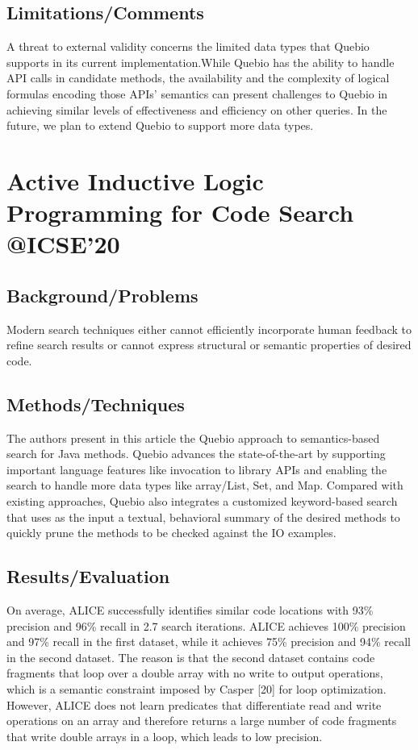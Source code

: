 \subsection{Limitations/Comments}
A threat to external validity concerns the limited data types that Quebio supports in its current implementation.While Quebio has the ability to handle API calls in candidate methods, the availability and the complexity of logical formulas encoding those APIs’ semantics can present challenges to Quebio in achieving similar levels of effectiveness and efficiency on other queries. In the future, we plan to extend Quebio to support more data types.
\newpage

\section{Active Inductive Logic Programming for Code Search \\@ICSE'20}
\subsection{Background/Problems}
Modern search techniques either cannot efficiently incorporate human feedback to refine search results or cannot express structural or semantic properties of desired code.
\subsection{Methods/Techniques}
The authors present in this article the Quebio approach to semantics-based search for Java methods. Quebio advances the state-of-the-art by supporting important language features like invocation to library APIs and enabling the search to handle more data types like array/List, Set, and Map. Compared with existing approaches, Quebio also integrates a customized keyword-based search that uses as the input a textual, behavioral summary of the desired methods to quickly prune the methods to be checked against the IO examples.

\subsection{Results/Evaluation}
On average, ALICE successfully identifies similar code locations with 93\% precision and 96\% recall in 2.7 search iterations. ALICE achieves 100\% precision and 97\% recall in the first dataset, while it achieves 75\% precision and 94\% recall in the second dataset. The reason is that the second dataset contains code fragments that loop over a double array with no write to output operations, which is a semantic constraint imposed by Casper [20] for loop optimization. However, ALICE does not learn predicates that differentiate read and write operations on an array and therefore returns a large number of code fragments that write double arrays in a loop, which leads to low precision.

